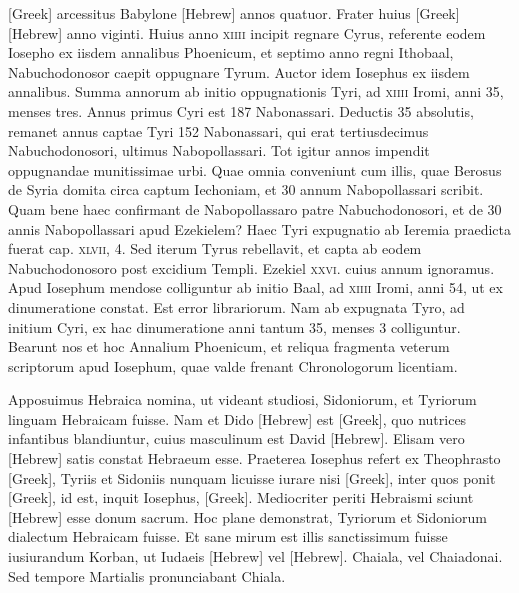 \begin{parnumbers}
\textgreek{[Greek]} arcessitus Babylone \texthebrew{[Hebrew]} annos quatuor.
\lnr{}Frater huius \textgreek{[Greek]} \texthebrew{[Hebrew]} anno viginti.
\lnr{}Huius anno \textsc{xiiii}
incipit regnare Cyrus, referente eodem Iosepho ex iisdem annalibus
Phoenicum, et septimo anno regni Ithobaal, Nabuchodonosor
caepit oppugnare Tyrum.
\lnr{}Auctor idem Iosephus ex iisdem
annalibus.
\lnr{}Summa annorum ab initio oppugnationis Tyri, ad
\textsc{xiiii} Iromi, anni 35, menses tres.
\lnr{}Annus primus Cyri est 187 Nabonassari.
\lnr{}Deductis 35 absolutis, remanet annus captae Tyri 152
Nabonassari, qui erat tertiusdecimus Nabuchodonosori, ultimus
Nabopollassari.
\lnr{}Tot igitur annos impendit oppugnandae munitissimae
urbi.
\lnr{}Quae omnia conveniunt cum illis, quae Berosus de Syria
domita circa captum Iechoniam, et 30 annum Nabopollassari scribit.
\lnr{}Quam bene haec confirmant de Nabopollassaro patre Nabuchodonosori,
et de 30 annis Nabopollassari apud Ezekielem?
\lnr{}Haec Tyri expugnatio ab Ieremia praedicta fuerat cap. \textsc{xlvii}, 4.
\lnr{}Sed iterum
Tyrus rebellavit, et capta ab eodem Nabuchodonosoro post
excidium Templi.
\lnr{}Ezekiel \textsc{xxvi}. cuius annum ignoramus.
\lnr{}Apud
Iosephum mendose colliguntur ab initio Baal, ad \textsc{xiiii} Iromi, anni
54, ut ex dinumeratione constat.
\lnr{}Est error librariorum.
\lnr{}Nam ab expugnata
Tyro, ad initium Cyri, ex hac dinumeratione anni tantum
35, menses 3 colliguntur.
\lnr{}Bearunt nos et hoc Annalium Phoenicum,
et reliqua fragmenta veterum scriptorum apud Iosephum, quae valde
frenant Chronologorum licentiam.

{}
\lnr{}Apposuimus Hebraica
nomina, ut videant studiosi, Sidoniorum, et Tyriorum linguam
Hebraicam fuisse.
\lnr{}Nam et Dido \texthebrew{[Hebrew]} est \textgreek{[Greek]}, quo nutrices
infantibus blandiuntur, cuius masculinum est David \texthebrew{[Hebrew]}.
\lnr{}Elisam
vero \texthebrew{[Hebrew]} satis constat Hebraeum esse.
\lnr{}Praeterea Iosephus refert
ex Theophrasto \textgreek{[Greek]}, Tyriis et Sidoniis nunquam licuisse
iurare nisi \textgreek{[Greek]},
 inter quos ponit \textgreek{[Greek]}, id est, inquit
Iosephus, \textgreek{[Greek]}.
\lnr{}Mediocriter periti Hebraismi sciunt \texthebrew{[Hebrew]} esse
donum sacrum.
\lnr{}Hoc plane demonstrat, Tyriorum et Sidoniorum
dialectum Hebraicam fuisse.
\lnr{}Et sane mirum est illis sanctissimum
fuisse iusiurandum Korban, ut Iudaeis
 \texthebrew{[Hebrew]} vel \texthebrew{[Hebrew]}.
\lnr{}Chaiala,
vel Chaiadonai.
\lnr{}Sed tempore Martialis pronunciabant Chiala.


\end{parnumbers}
